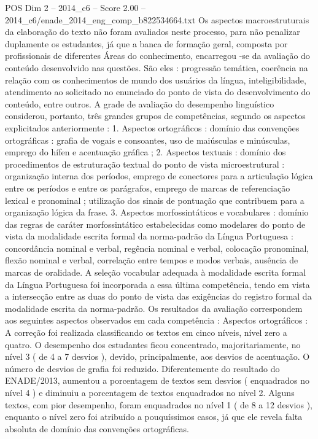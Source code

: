 \begin{textsample}{POS Dim 2 – 2014\_c6 – Score 2.00 – 2014\_c6/enade\_2014\_eng\_comp\_b822534664.txt}
Os aspectos macroestruturais da elaboração do texto não foram avaliados neste processo, para não penalizar duplamente os estudantes, já que a banca de formação geral, composta por profissionais de diferentes Áreas do conhecimento, encarregou -se da avaliação do conteúdo desenvolvido nas questões.
São eles : progressão temática, coerência na relação com os conhecimentos de mundo dos usuários da língua, inteligibilidade, atendimento ao solicitado no enunciado do ponto de vista do desenvolvimento do conteúdo, entre outros.
A grade de avaliação do desempenho linguístico considerou, portanto, três grandes grupos de competências, segundo os aspectos explicitados anteriormente : 1.
Aspectos ortográficos : domínio das convenções ortográficas : grafia de vogais e consoantes, uso de maiúsculas e minúsculas, emprego do hífen e acentuação gráfica ; 2.
Aspectos textuais : domínio dos procedimentos de estruturação textual do ponto de vista microestrutural : organização interna dos períodos, emprego de conectores para a articulação lógica entre os períodos e entre os parágrafos, emprego de marcas de referenciação lexical e pronominal ; utilização dos sinais de pontuação que contribuem para a organização lógica da frase. 3.
Aspectos morfossintáticos e vocabulares : domínio das regras de caráter morfossintático estabelecidas como modelares do ponto de vista da modalidade escrita formal da norma-padrão da Língua Portuguesa : concordância nominal e verbal, regência nominal e verbal, colocação pronominal, flexão nominal e verbal, correlação entre tempos e modos verbais, ausência de marcas de oralidade.
A seleção vocabular adequada à modalidade escrita formal da Língua Portuguesa foi incorporada a essa última competência, tendo em vista a intersecção entre as duas do ponto de vista das exigências do registro formal da modalidade escrita da norma-padrão.
Os resultados da avaliação correspondem aos seguintes aspectos observados em cada competência : Aspectos ortográficos : A correção foi realizada classificando os textos em cinco níveis, nível zero a quatro.
O desempenho dos estudantes ficou concentrado, majoritariamente, no nível 3 ( de 4 a 7 desvios ), devido, principalmente, aos desvios de acentuação.
O número de desvios de grafia foi reduzido.
Diferentemente do resultado do ENADE/2013, aumentou a porcentagem de textos sem desvios ( enquadrados no nível 4 ) e diminuiu a porcentagem de textos enquadrados no nível 2.
Alguns textos, com pior desempenho, foram enquadrados no nível 1 ( de 8 a 12 desvios ), enquanto o nível zero foi atribuído a pouquíssimos casos, já que ele revela falta absoluta de domínio das convenções ortográficas.

\end{textsample}
